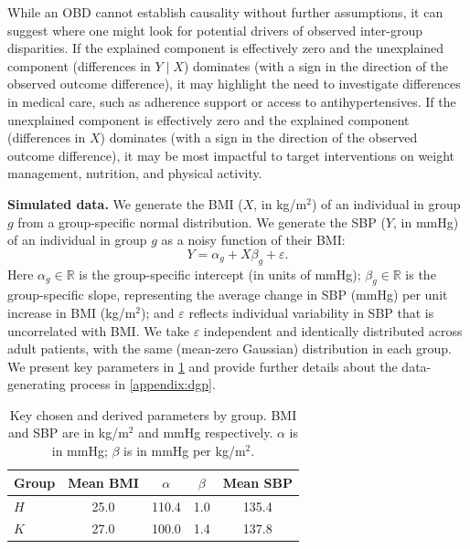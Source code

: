 While an OBD cannot establish causality without further assumptions, it can suggest where one might look for potential drivers of observed inter-group disparities.
If the explained component is effectively zero and the unexplained component (differences in $Y \mid X$) dominates (with a sign in the direction of the observed outcome difference), it may highlight the need to investigate differences in medical care, such as adherence support or access to antihypertensives.
If the unexplained component is effectively zero and the explained component (differences in $X$) dominates (with a sign in the direction of the observed outcome difference), it may be most impactful to target interventions on weight management, nutrition, and physical activity. 

\textbf{Simulated data.}
We generate the BMI ($X$, in kg/m$^2$) of an individual in group \( g \) from a group-specific normal distribution.
We generate the SBP ($Y$, in mmHg) of an individual in group \( g \) as a noisy function of their BMI:
\begin{equation}
    \label{eq:linear_model}
   Y = \alpha_g + X \beta_g + \varepsilon.
\end{equation}
Here $\alpha_g \in \mathbb{R}$ is the group-specific intercept (in units of mmHg); $\beta_g \in \mathbb{R}$ is the group-specific slope, representing the average change in SBP (mmHg) per unit increase in BMI (kg/m$^2$); and $\varepsilon$ reflects individual variability in SBP that is uncorrelated with BMI. We take $\varepsilon$ independent and identically distributed across adult patients, with the same (mean-zero Gaussian) distribution in each group.
We present key parameters in \cref{tab:dgp_short} and provide further details about the data-generating process in \cref{appendix:dgp}.

\begin{table}[h]
\caption{Key chosen and derived parameters by group. BMI and SBP are in kg/m$^2$ and mmHg respectively. $\alpha$ is in mmHg; $\beta$ is in mmHg per kg/m$^2$.}
\label{tab:dgp_short}
\begin{center}
\small
\begin{tabular}{lcccc}
\toprule
Group & Mean BMI & $\alpha$ & $\beta$ & Mean SBP \\
\midrule
$H$ & 25.0 & 110.4 & 1.0 & 135.4 \\
$K$ & 27.0 & 100.0 & 1.4 & 137.8 \\
\bottomrule
\end{tabular}
\end{center}
\vskip -0.1in
\end{table}

